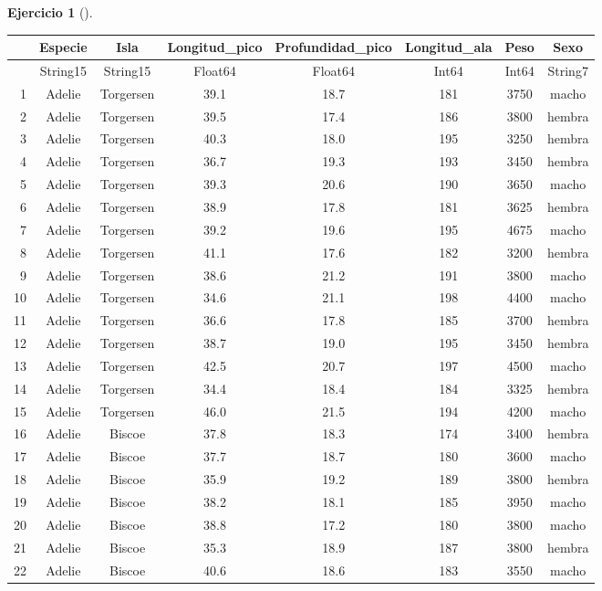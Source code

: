 \documentclass[
  a4paper,
]{scrreport}
\theoremstyle{definition}
\newtheorem{exercise}{Ejercicio}[chapter]
\theoremstyle{remark}
\begin{document}
\begin{exercise}[]
\begin{enumerate}
\begin{tcolorbox}
  \begin{tabular}{r|ccccccc}
      & Especie & Isla & Longitud\_pico & Profundidad\_pico & Longitud\_ala & Peso & Sexo\\
      \hline
      & String15 & String15 & Float64 & Float64 & Int64 & Int64 & String7\\
      \hline
      1 & Adelie & Torgersen & 39.1 & 18.7 & 181 & 3750 & macho \\
      2 & Adelie & Torgersen & 39.5 & 17.4 & 186 & 3800 & hembra \\
      3 & Adelie & Torgersen & 40.3 & 18.0 & 195 & 3250 & hembra \\
      4 & Adelie & Torgersen & 36.7 & 19.3 & 193 & 3450 & hembra \\
      5 & Adelie & Torgersen & 39.3 & 20.6 & 190 & 3650 & macho \\
      6 & Adelie & Torgersen & 38.9 & 17.8 & 181 & 3625 & hembra \\
      7 & Adelie & Torgersen & 39.2 & 19.6 & 195 & 4675 & macho \\
      8 & Adelie & Torgersen & 41.1 & 17.6 & 182 & 3200 & hembra \\
      9 & Adelie & Torgersen & 38.6 & 21.2 & 191 & 3800 & macho \\
      10 & Adelie & Torgersen & 34.6 & 21.1 & 198 & 4400 & macho \\
      11 & Adelie & Torgersen & 36.6 & 17.8 & 185 & 3700 & hembra \\
      12 & Adelie & Torgersen & 38.7 & 19.0 & 195 & 3450 & hembra \\
      13 & Adelie & Torgersen & 42.5 & 20.7 & 197 & 4500 & macho \\
      14 & Adelie & Torgersen & 34.4 & 18.4 & 184 & 3325 & hembra \\
      15 & Adelie & Torgersen & 46.0 & 21.5 & 194 & 4200 & macho \\
      16 & Adelie & Biscoe & 37.8 & 18.3 & 174 & 3400 & hembra \\
      17 & Adelie & Biscoe & 37.7 & 18.7 & 180 & 3600 & macho \\
      18 & Adelie & Biscoe & 35.9 & 19.2 & 189 & 3800 & hembra \\
      19 & Adelie & Biscoe & 38.2 & 18.1 & 185 & 3950 & macho \\
      20 & Adelie & Biscoe & 38.8 & 17.2 & 180 & 3800 & macho \\
      21 & Adelie & Biscoe & 35.3 & 18.9 & 187 & 3800 & hembra \\
      22 & Adelie & Biscoe & 40.6 & 18.6 & 183 & 3550 & macho \\

\end{tabular}
\end{tcolorbox}
\end{enumerate}
\end{exercise}
\end{document}
